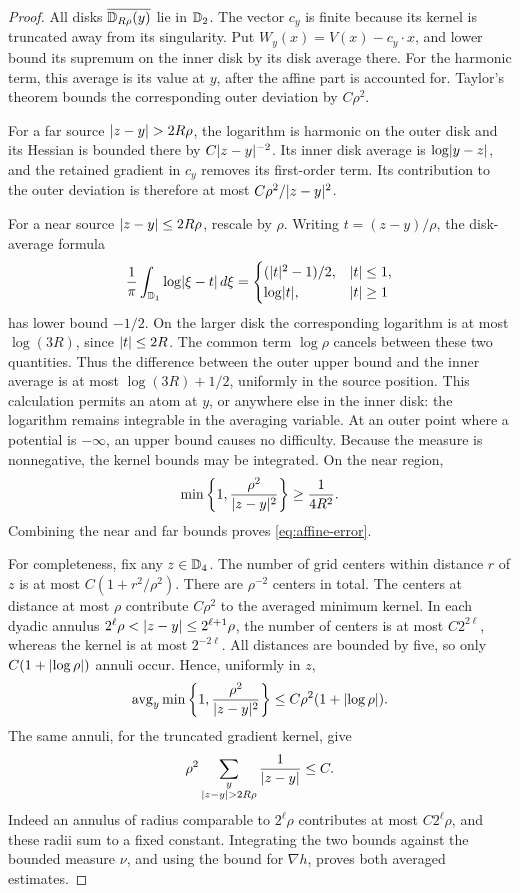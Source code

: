 \begin{proof}
All disks \(\overline{\mathbb D_{R\rho}(y)}\) lie in \(\mathbb D_2\).  The vector
\(c_y\) is finite because its kernel is truncated away from its
singularity.  Put \(W_y(x)=V(x)-c_y\cdot x\), and lower bound its
supremum on the inner disk by its disk average there.  For the
harmonic term, this average is its value at \(y\), after the affine
part is accounted for.  Taylor's theorem bounds the corresponding
outer deviation by \(C\rho^2\).

For a far source \(\lvert z-y\rvert>2R\rho\), the logarithm is harmonic
on the outer disk and its Hessian is bounded there by
\(C\lvert z-y\rvert^{-2}\).  Its inner disk average is
\(\log\lvert y-z\rvert\), and the retained gradient in \(c_y\) removes
its first-order term.  Its contribution to the outer deviation is
therefore at most \(C\rho^2/\lvert z-y\rvert^2\).

For a near source \(\lvert z-y\rvert\le2R\rho\), rescale by \(\rho\).
Writing \(t=(z-y)/\rho\), the disk-average formula
\[
 \frac1\pi\int_{\mathbb D_1}\log\lvert\xi-t\rvert\,d\xi
 =
 \begin{cases}
  (\lvert t\rvert^2-1)/2,&\lvert t\rvert\le1,\\
  \log\lvert t\rvert,&\lvert t\rvert\ge1
 \end{cases}
\]
has lower bound \(-1/2\).  On the larger disk the corresponding
logarithm is at most \(\log(3R)\), since \(\lvert t\rvert\le2R\).
The common term \(\log\rho\) cancels between these two quantities.
Thus the difference between the outer upper bound and the inner
average is at most \(\log(3R)+1/2\), uniformly in the source position.
This calculation permits an atom at \(y\), or anywhere else in
the inner disk: the logarithm remains integrable in the averaging
variable.  At an outer point where a potential is \(-\infty\), an
upper bound causes no difficulty.  Because the measure is
nonnegative, the kernel bounds may be integrated.  On the near
region,
\[
 \min\left\{1,\frac{\rho^2}{\lvert z-y\rvert^2}\right\}
 \ge\frac1{4R^2}.
\]
Combining the near and far bounds proves
\eqref{eq:affine-error}.

For completeness, fix any \(z\in\mathbb D_4\).  The number of grid centers
within distance \(r\) of \(z\) is at most
\(C(1+r^2/\rho^2)\).  There are \(\rho^{-2}\) centers in total.
The centers at distance at most \(\rho\) contribute \(C\rho^2\)
to the averaged minimum kernel.  In each dyadic annulus
\(2^\ell\rho<\lvert z-y\rvert\le2^{\ell+1}\rho\), the number of centers
is at most \(C2^{2\ell}\), whereas the kernel is at most
\(2^{-2\ell}\).  All distances are bounded by five, so only
\(C(1+\lvert\log\rho\rvert)\) annuli occur.  Hence, uniformly in \(z\),
\[
 \operatorname{avg}_y\min\left\{1,\frac{\rho^2}{\lvert z-y\rvert^2}\right\}
 \le C\rho^2(1+\lvert\log\rho\rvert).
\]
The same annuli, for the truncated gradient kernel, give
\[
 \rho^2\sum_{\substack{y\\\lvert z-y\rvert>2R\rho}}
 \frac1{\lvert z-y\rvert}
 \le C.
\]
Indeed an annulus of radius comparable to \(2^\ell\rho\)
contributes at most \(C2^\ell\rho\), and these radii sum to a
fixed constant.  Integrating the two bounds against the bounded
measure \(\nu\), and using the bound for \(\nabla h\), proves
both averaged estimates.
\end{proof}

